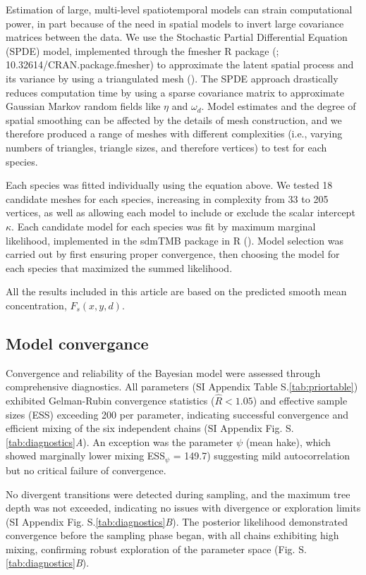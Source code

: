 \documentclass{article}
\begin{document}
Estimation of large, multi-level spatiotemporal models can strain computational power, in part because of the need in spatial models to invert large covariance matrices between the data. We use the Stochastic Partial Differential Equation (SPDE) model, implemented through the fmesher R package (\cite{lindgren2024}; 10.32614/CRAN.package.fmesher) to approximate the latent spatial process and its variance by using a triangulated mesh (\cite{lindgren2011}). The SPDE approach drastically reduces computation time by using a sparse covariance matrix to approximate Gaussian Markov random fields like $\eta$ and $\omega_d$. Model estimates and the degree of spatial smoothing can be affected by the details of mesh construction, and we therefore produced a range of meshes with different complexities (i.e., varying numbers of triangles, triangle sizes, and therefore vertices) to test for each species. 

Each species was fitted individually using the equation above. We tested 18 candidate meshes for each species, increasing in complexity from 33 to 205 vertices, as well as allowing each model to include or exclude the scalar intercept $\kappa$. Each candidate model for each species was fit by maximum marginal likelihood, implemented in the sdmTMB package in R (\cite{anderson2022}). Model selection was carried out by first ensuring proper convergence, then choosing the model for each species that maximized the summed likelihood.

All the results included in this article are based on the predicted smooth mean concentration, $F_s(x,y,d)$.

\subsection*{Model convergance}

Convergence and reliability of the Bayesian model were assessed through comprehensive diagnostics. All parameters (SI Appendix Table S.\ref{tab:priortable}) exhibited Gelman-Rubin convergence statistics ($\hat{R} < 1.05$) and effective sample sizes (ESS) exceeding 200 per parameter, indicating successful convergence and efficient mixing of the six independent chains (SI Appendix Fig. S.\ref{tab:diagnostics}\textit{A}). An exception was the parameter $\psi$ (mean hake), which showed marginally lower mixing ESS$_\psi$ = 149.7) suggesting mild autocorrelation but no critical failure of convergence.

No divergent transitions were detected during sampling, and the maximum tree depth was not exceeded, indicating no issues with divergence or exploration limits (SI Appendix Fig. S.\ref{tab:diagnostics}\textit{B}). The posterior likelihood demonstrated convergence before the sampling phase began, with all chains exhibiting high mixing, confirming robust exploration of the parameter space (Fig. S.\ref{tab:diagnostics}\textit{B}).
\end{document}
